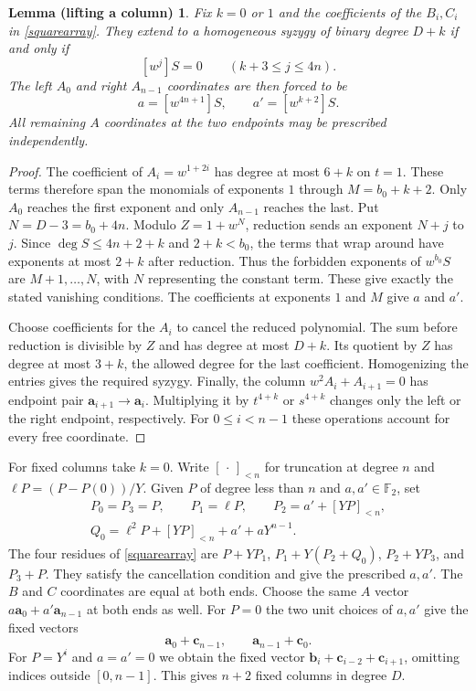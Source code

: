 \documentclass[11pt,a4paper,reqno]{amsart}
\numberwithin{equation}{section}
\theoremstyle{plain}
\newtheorem*{liftcriterion}{Lemma (lifting a column)}
\begin{document}
\begin{liftcriterion}
Fix $k=0$ or $1$ and the coefficients of the $B_i,C_i$ in \eqref{squarearray}. They extend to a homogeneous syzygy of binary degree $D+k$ if and only if
\[
 [w^j]S=0\qquad(k+3\le j\le4n).
\]
The left $A_0$ and right $A_{n-1}$ coordinates are then forced to be
\[
 a=[w^{4n+1}]S,\qquad a'=[w^{k+2}]S .
\]
All remaining $A$ coordinates at the two endpoints may be prescribed independently.
\end{liftcriterion}
\begin{proof}
The coefficient of $A_i=w^{1+2i}$ has degree at most $6+k$ on $t=1$. These terms therefore span the monomials of exponents $1$ through $M=b_0+k+2$. Only $A_0$ reaches the first exponent and only $A_{n-1}$ reaches the last. Put $N=D-3=b_0+4n$. Modulo $Z=1+w^N$, reduction sends an exponent $N+j$ to $j$. Since $\deg S\le4n+2+k$ and $2+k<b_0$, the terms that wrap around have exponents at most $2+k$ after reduction. Thus the forbidden exponents of $w^{b_0}S$ are $M+1,\ldots,N$, with $N$ representing the constant term. These give exactly the stated vanishing conditions. The coefficients at exponents $1$ and $M$ give $a$ and $a'$.

Choose coefficients for the $A_i$ to cancel the reduced polynomial. The sum before reduction is divisible by $Z$ and has degree at most $D+k$. Its quotient by $Z$ has degree at most $3+k$, the allowed degree for the last coefficient. Homogenizing the entries gives the required syzygy. Finally, the column $w^2A_i+A_{i+1}=0$ has endpoint pair $\mathbf a_{i+1}\to\mathbf a_i$. Multiplying it by $t^{4+k}$ or $s^{4+k}$ changes only the left or the right endpoint, respectively. For $0\le i<n-1$ these operations account for every free coordinate.
\end{proof}

For fixed columns take $k=0$. Write $[\,\cdot\,]_{<n}$ for truncation at degree $n$ and $\ell P=(P-P(0))/Y$. Given $P$ of degree less than $n$ and $a,a'\in\mathbb F_2$, set
\[
 \begin{gathered}
 P_0=P_3=P,\qquad P_1=\ell P,\qquad P_2=a'+[YP]_{<n},\\
 Q_0=\ell^2P+[YP]_{<n}+a'+aY^{n-1}.
 \end{gathered}
\]
The four residues of \eqref{squarearray} are $P+YP_1$, $P_1+Y(P_2+Q_0)$, $P_2+YP_3$, and $P_3+P$. They satisfy the cancellation condition and give the prescribed $a,a'$. The $B$ and $C$ coordinates are equal at both ends. Choose the same $A$ vector $a\mathbf a_0+a'\mathbf a_{n-1}$ at both ends as well. For $P=0$ the two unit choices of $a,a'$ give the fixed vectors
\[
 \mathbf a_0+\mathbf c_{n-1},\qquad \mathbf a_{n-1}+\mathbf c_0 .
\]
For $P=Y^i$ and $a=a'=0$ we obtain the fixed vector
$\mathbf b_i+\mathbf c_{i-2}+\mathbf c_{i+1}$, omitting indices outside $[0,n-1]$. This gives $n+2$ fixed columns in degree $D$.
\end{document}
